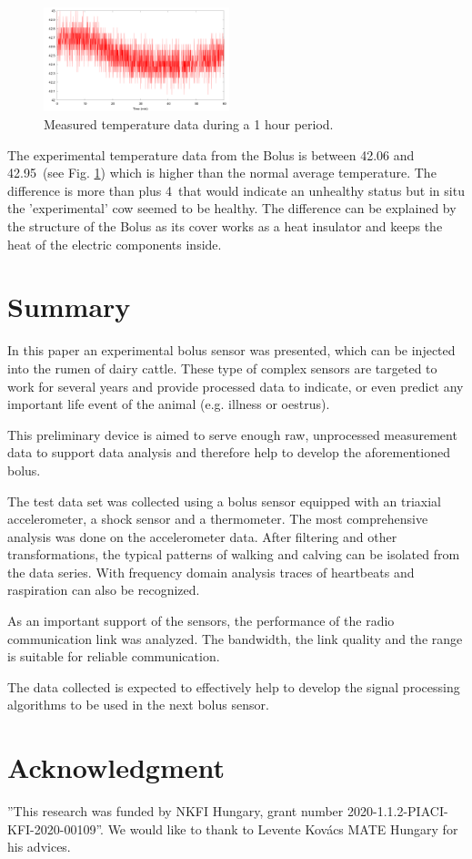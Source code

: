 \documentclass[conference]{IEEEtran}
\begin{document}
\begin{figure}[htbp]
\centerline{\includegraphics[width=0.48\textwidth]{fig/temp-plot.png}}
  \caption{Measured temperature data during a 1 hour period.}
\label{temp-plot}
\end{figure}


The experimental temperature data from the Bolus is between 42.06 and 42.95\textcelsius\ (see Fig. \ref{temp-plot})
which is higher than the normal average temperature. The
difference is more than plus 4\textcelsius\  that would indicate an unhealthy
status but in situ the 'experimental' cow seemed to be healthy. The difference
can be explained by the structure of the Bolus as its cover works as a heat
insulator and keeps the heat of the electric components inside.

\section{Summary}

In this paper an experimental bolus sensor was presented, which can be injected
into the rumen of dairy cattle. These type of complex sensors are targeted
to work for several years and provide processed data to indicate, or even
predict any important life event of the animal (e.g. illness or oestrus).

This preliminary device is aimed to serve enough raw, unprocessed measurement
data to support data analysis and therefore help to develop the aforementioned
bolus.

The test data set was collected using a bolus sensor equipped with an triaxial
accelerometer, a shock sensor and a thermometer. The most comprehensive analysis
was done on the accelerometer data. After filtering and other transformations,
the typical patterns of walking and calving
can be isolated from the data series. With frequency domain analysis traces of
heartbeats and raspiration can also be recognized.

As an important support of the
sensors, the performance of the radio communication link was analyzed. The bandwidth,
the link quality and the range is suitable for reliable communication.

The data collected is expected to effectively help to develop the signal processing
algorithms to be used in the next bolus sensor.

\section*{Acknowledgment}

''This research was funded by NKFI Hungary, grant number
2020-1.1.2-PIACI-KFI-2020-00109''. We would like to thank to Levente Kovács
MATE Hungary for his advices.



\end{document}
